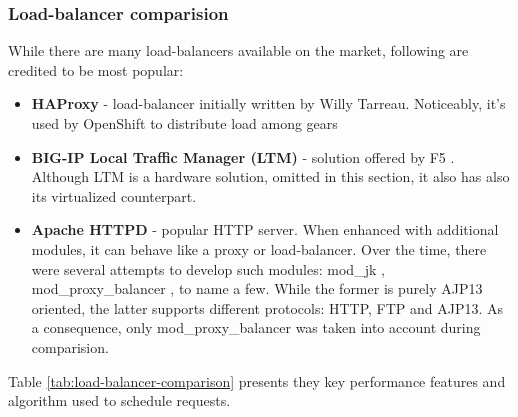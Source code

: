 \subsubsection{Load-balancer comparision}

While there are many load-balancers available on the market, following are credited to be most popular:
\begin{itemize}
 \item \textbf{HAProxy} \cite{HAProxy} - load-balancer initially written by Willy Tarreau. Noticeably, it's used by OpenShift \cite{OpenShift} to distribute load among gears \cite{OpenShiftScaling}
 \item \textbf{BIG-IP Local Traffic Manager (LTM)} - solution offered by F5 \cite{F5}. Although LTM is a hardware solution, omitted in this section, it also has also its virtualized counterpart.
 \item \textbf{Apache HTTPD} \cite{ApacheHTTPD} - popular HTTP server. When enhanced with additional modules, it can behave like a proxy or load-balancer. Over the time, there were several attempts to develop such modules: mod\_jk \cite{ApacheModJk}, mod\_proxy\_balancer \cite{ApacheModProxyBalancer}, to name a few. While the former is purely AJP13 oriented, the latter supports different protocols: HTTP, FTP and AJP13. As a consequence, only mod\_proxy\_balancer was taken into account during comparision.
\end{itemize}

Table \ref{tab:load-balancer-comparison} presents they key performance features and algorithm used to schedule requests.

